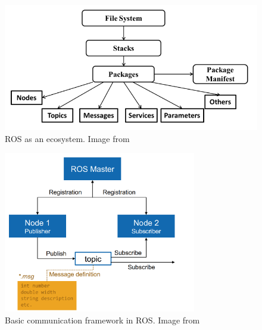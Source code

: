 \begin{figure}[!b]
    \centering
    \includegraphics[width=\textwidth]{images/ros1.png}
    \caption{ROS as an ecosystem. Image from \cite{49}}
    \label{fig:r1}
\end{figure}

\begin{figure}[!b]
    \centering
    \includegraphics[width=0.75\textwidth]{images/ros2.png}
    \caption{Basic communication framework in ROS. Image from \cite{48}}
    \label{fig:r2}
\end{figure}

